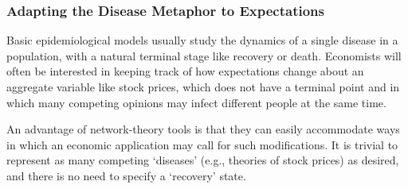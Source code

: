




\subsubsection{Adapting the Disease Metaphor to Expectations}\label{subsubsec:AdaptingTheModel}
\hypertarget{AdaptingTheModel}{}

Basic epidemiological models usually study the dynamics of a single disease in a population, with a natural terminal stage like recovery or death.  Economists will often be interested in keeping track of how expectations change about an aggregate variable like stock prices, which does not have a terminal point and in which many competing opinions may infect different people at the same time.

An advantage of network-theory tools is that they can easily accommodate ways in which an economic application may call for such modifications.  It is trivial  to represent as many competing `diseases' (e.g., theories of stock prices) as desired, and there is no need to specify a `recovery' state.

